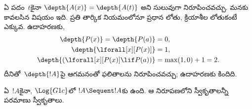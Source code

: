 \documentclass[../../../include/open-logic-section]{subfiles}
\begin{document}
ఏ పదం~$t$కైనా $\depth{A(x)} = \depth{A(t)}$ అని సులువుగా నిరూపించవచ్చు. మనకు కావలసిన విషయం ఇది. ప్రతి తార్కిక నియమంలోనూ ప్రధాన  లోతు, క్రియాశీల  లోతుకంటే ఎక్కువ. ఉదాహరణకు,
\begin{align*}
\depth{P(x)} = \depth{P(a)} & = 0,\\
\depth{\lforall[x][P(x)]} & = 1,\\
\depth{(\lforall[x][P(x)] \lif P(a))} & = \max(1,0) + 1 = 2.
\end{align*}
దీనితో~$\depth{!A}$పై ఆగమనంతో ఫలితాలను నిరూపించవచ్చు; ఉదాహరణకు కిందిది.


\begin{prop}
ఏ~$!A$కైనా, $\Log{G1c}$లో $!A \Sequent !A$కు  ఉంది. ఆ నిరూపణలోని స్వీకృతాలన్నీ పరమాణు స్వీకృతాలు.
\end{prop}
\end{document}
